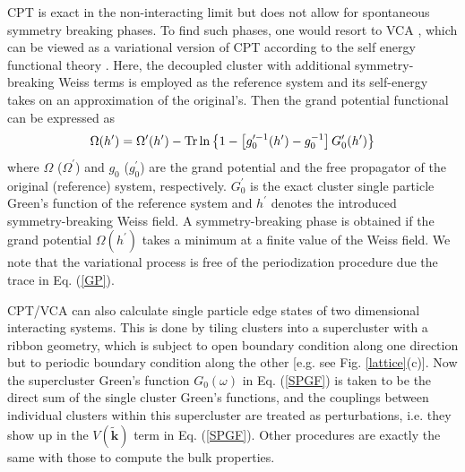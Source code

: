 \documentclass[12pt]{iopart}
\begin{document}
\par CPT is exact in the non-interacting limit but does not allow for spontaneous symmetry breaking phases. To find such phases, one would resort to VCA \cite{PAD_PRL2003}, which can be viewed as a variational version of CPT according to the self energy functional theory \cite{P_EPJB2003}. Here, the decoupled cluster with additional symmetry-breaking Weiss terms is employed as the reference system and its self-energy takes on an approximation of the original's. Then the grand potential functional can be expressed as
\begin{equation}\label{GP}
\Omega(h^\prime)=\Omega^\prime(h^\prime)-\mathop{\mathrm{Tr}}\nolimits\ln\left\{1-\left[g_0^{\prime-1}(h^\prime)-g_0^{-1}\right]G^\prime_0(h^\prime)\right\}
\end{equation}
where $\Omega$ ($\Omega^\prime$) and $g_0$ ($g_0^\prime$) are the grand potential and the free propagator of the original (reference) system, respectively. $G^\prime_0$ is the exact cluster single particle Green's function of the reference system and $h^\prime$ denotes the introduced symmetry-breaking Weiss field. A symmetry-breaking phase is obtained if the grand potential $\Omega(h^\prime)$ takes a minimum at a finite value of the Weiss field. We note that the variational process is free of the periodization procedure due the trace in Eq. (\ref{GP}).

\par CPT/VCA can also calculate single particle edge states of two dimensional interacting systems. This is done by tiling clusters into a supercluster with a ribbon geometry, which is subject to open boundary condition along one direction but to periodic boundary condition along the other [e.g. see Fig. \ref{lattice}(c)]. Now the supercluster Green's function $G_0(\omega)$ in Eq. (\ref{SPGF}) is taken to be the direct sum of the single cluster Green's functions, and the couplings between individual clusters within this supercluster are treated as perturbations, i.e. they show up in the $V(\widetilde{\mathbf{k}})$ term in Eq. (\ref{SPGF}). Other procedures are exactly the same with those to compute the bulk properties.
\end{document}
